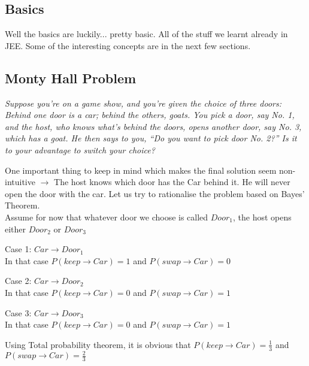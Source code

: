 
		\subsection{Basics}
			Well the basics are luckily... pretty basic. All of the stuff we learnt already in JEE. Some of the interesting concepts are in the next few sections.

		\subsection{Monty Hall Problem}
		\begin{greenbox}
			\centering \emph{Suppose you’re on a game show, and you’re given the choice of three doors: Behind one door is a car; behind the others, goats. You pick a door, say No. 1, and the host, who knows what’s behind the doors, opens another door, say No. 3, which has a goat. He then says to you, “Do you want to pick door No. 2?” Is it to your advantage to switch your choice? } \par
		\end{greenbox}

			\raggedright One important thing to keep in mind which makes the final solution seem non-intuitive \(\rightarrow\) The host knows which door has the Car behind it. He will never open the door with the car.
			Let us try to rationalise the problem based on Bayes' Theorem.\\
			Assume for now that whatever door we choose is called $Door_1$, the host opens either $Door_2$ or $Door_3$ \par

			Case 1: $Car \rightarrow Door_1$\\
			\quad In that case $P(keep\rightarrow Car)=1$ and $P(swap\rightarrow Car)=0$

			Case 2: $Car \rightarrow Door_2$\\
			\quad In that case $P(keep\rightarrow Car)=0$ and $P(swap\rightarrow Car)=1$

			Case 3: $Car \rightarrow Door_3$\\
			\quad In that case $P(keep\rightarrow Car)=0$ and $P(swap\rightarrow Car)=1$\par 

			Using Total probability theorem, it is obvious that $P(keep \rightarrow Car)= \frac{1}{3}$ and $P(swap \rightarrow Car)= \frac{2}{3}$